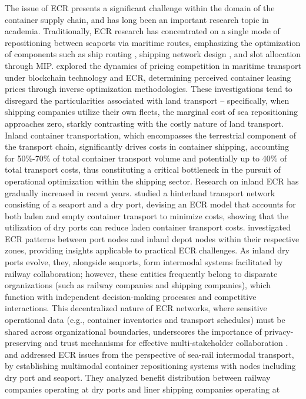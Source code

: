 \documentclass[preprint,12pt]{elsarticle}
\begin{document}
The issue of ECR presents a significant challenge within the domain of the container supply chain, and has long been an important research topic in academia.  Traditionally, ECR research has concentrated on a single mode of repositioning between seaports via maritime routes, emphasizing the optimization of components such as ship routing \citep{xiangLinerFleetDeployment2024,xiangTacticalVesselDeployment2024,xuEmptyContainerRepositioning2024}, shipping network design \citep{kuzmiczContainerDepotLocation2020, shanExactAlgorithmInland2020, zhangTacticalOperationalCooperative2019}, and slot allocation \citep{liangDynamicContainerSlot2024} through MIP. \citet{yuPricingCompetitionMaritime2024} explored the dynamics of pricing competition in maritime transport under blockchain technology and ECR, determining perceived container leasing prices through inverse optimization methodologies. These investigations tend to disregard the particularities associated with land transport – specifically, when shipping companies utilize their own fleets, the marginal cost of sea repositioning approaches zero, starkly contrasting with the costly nature of land transport. Inland container transportation, which encompasses the terrestrial component of the transport chain, significantly drives costs in container shipping, accounting for 50\%-70\% of total container transport volume and potentially up to 40\% of total transport costs, thus constituting a critical bottleneck in the pursuit of operational optimization within the shipping sector. Research on inland ECR has gradually increased in recent years. \citet{faziMultitripContainerDrayage2023} studied a hinterland transport network consisting of a seaport and a dry port, devising an ECR model that accounts for both laden and empty container transport to minimize costs, showing that the utilization of dry ports can reduce laden container transport costs. \citet{caiJointOptimizationEmpty2024} investigated ECR patterns between port nodes and inland depot nodes within their respective zones, providing insights applicable to practical ECR challenges. As inland dry ports evolve, they, alongside seaports, form intermodal systems facilitated by railway collaboration; however, these entities frequently belong to disparate organizations (such as railway companies and shipping companies), which function with independent decision-making processes and competitive interactions. This decentralized nature of ECR networks, where sensitive operational data (e.g., container inventories and transport schedules) must be shared across organizational boundaries, underscores the importance of privacy-preserving and trust mechanisms for effective multi-stakeholder collaboration \citep{addulaNovelPermissionedBlockchain2025}. \citet{luoEmptyContainerRepositioning2019} and \citet{xieEmptyContainerManagement2017} addressed ECR issues from the perspective of sea-rail intermodal transport, by establishing multimodal container repositioning systems with nodes including dry port and seaport. They analyzed benefit distribution between railway companies operating at dry ports and liner shipping companies operating at 
\end{document}
